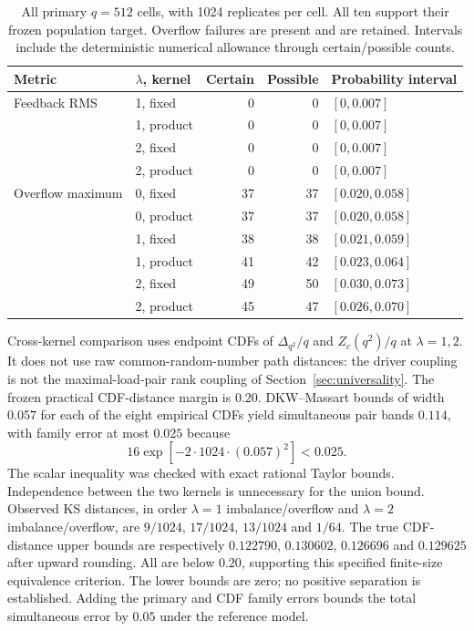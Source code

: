 \begin{table}[ht]
\caption{All primary $q=512$ cells, with 1024 replicates per cell. All ten support their frozen population target. Overflow failures are present and are retained. Intervals include the deterministic numerical allowance through certain/possible counts.}
\label{tab:primary}
\centering
\begin{tabular}{llrrl}\toprule
Metric & $\lambda$, kernel & Certain & Possible & Probability interval\\\midrule
Feedback RMS & 1, fixed & 0 & 0 & $[0,0.007]$\\
 & 1, product & 0 & 0 & $[0,0.007]$\\
 & 2, fixed & 0 & 0 & $[0,0.007]$\\
 & 2, product & 0 & 0 & $[0,0.007]$\\\midrule
Overflow maximum & 0, fixed & 37 & 37 & $[0.020,0.058]$\\
 & 0, product & 37 & 37 & $[0.020,0.058]$\\
 & 1, fixed & 38 & 38 & $[0.021,0.059]$\\
 & 1, product & 41 & 42 & $[0.023,0.064]$\\
 & 2, fixed & 49 & 50 & $[0.030,0.073]$\\
 & 2, product & 45 & 47 & $[0.026,0.070]$\\\bottomrule
\end{tabular}

\end{table}

Cross-kernel comparison uses endpoint CDFs of $\Delta_{q^2}/q$ and $Z_c(q^2)/q$ at $\lambda=1,2$. It does not use raw common-random-number path distances: the driver coupling is not the maximal-load-pair rank coupling of Section~\ref*{sec:universality}. The frozen practical CDF-distance margin is $0.20$. DKW--Massart bounds \cite{massart} of width $0.057$ for each of the eight empirical CDFs yield simultaneous pair bands $0.114$, with family error at most $0.025$ because
\[
 16\exp[-2\cdot1024\cdot(0.057)^2]<0.025.
\]
The scalar inequality was checked with exact rational Taylor bounds. Independence between the two kernels is unnecessary for the union bound. Observed KS distances, in order $\lambda=1$ imbalance/overflow and $\lambda=2$ imbalance/overflow, are $9/1024$, $17/1024$, $13/1024$ and $1/64$. The true CDF-distance upper bounds are respectively $0.122790$, $0.130602$, $0.126696$ and $0.129625$ after upward rounding. All are below $0.20$, supporting this specified finite-size equivalence criterion. The lower bounds are zero; no positive separation is established. Adding the primary and CDF family errors bounds the total simultaneous error by $0.05$ under the reference model.



